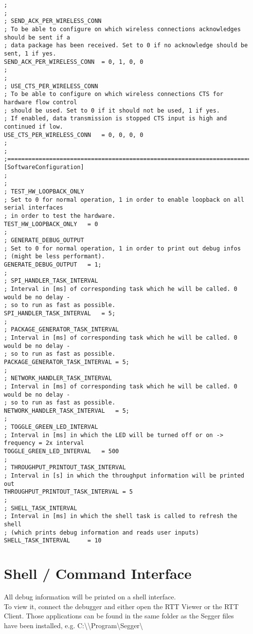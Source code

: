 \begin{lstlisting}
;
;
; SEND_ACK_PER_WIRELESS_CONN
; To be able to configure on which wireless connections acknowledges should be sent if a 
; data package has been received. Set to 0 if no acknowledge should be sent, 1 if yes.
SEND_ACK_PER_WIRELESS_CONN	= 0, 1, 0, 0
;
;
; USE_CTS_PER_WIRELESS_CONN
; To be able to configure on which wireless connections CTS for hardware flow control 
; should be used. Set to 0 if it should not be used, 1 if yes.
; If enabled, data transmission is stopped CTS input is high and continued if low.
USE_CTS_PER_WIRELESS_CONN	= 0, 0, 0, 0
;
;
;========================================================================================
[SoftwareConfiguration]
;
;
; TEST_HW_LOOPBACK_ONLY
; Set to 0 for normal operation, 1 in order to enable loopback on all serial interfaces 
; in order to test the hardware.
TEST_HW_LOOPBACK_ONLY	= 0
;
; GENERATE_DEBUG_OUTPUT
; Set to 0 for normal operation, 1 in order to print out debug infos 
; (might be less performant).
GENERATE_DEBUG_OUTPUT	= 1;
;
; SPI_HANDLER_TASK_INTERVAL
; Interval in [ms] of corresponding task which he will be called. 0 would be no delay - 
; so to run as fast as possible.
SPI_HANDLER_TASK_INTERVAL	= 5;
;
; PACKAGE_GENERATOR_TASK_INTERVAL
; Interval in [ms] of corresponding task which he will be called. 0 would be no delay - 
; so to run as fast as possible.
PACKAGE_GENERATOR_TASK_INTERVAL	= 5;
;
; NETWORK_HANDLER_TASK_INTERVAL
; Interval in [ms] of corresponding task which he will be called. 0 would be no delay - 
; so to run as fast as possible.
NETWORK_HANDLER_TASK_INTERVAL	= 5;
;
; TOGGLE_GREEN_LED_INTERVAL
; Interval in [ms] in which the LED will be turned off or on -> frequency = 2x interval
TOGGLE_GREEN_LED_INTERVAL	= 500
;
; THROUGHPUT_PRINTOUT_TASK_INTERVAL
; Interval in [s] in which the throughput information will be printed out
THROUGHPUT_PRINTOUT_TASK_INTERVAL = 5
;
; SHELL_TASK_INTERVAL
; Interval in [ms] in which the shell task is called to refresh the shell 
; (which prints debug information and reads user inputs)
SHELL_TASK_INTERVAL		= 10
\end{lstlisting}
%
%
%
%
%
\section{Shell / Command Interface}
All debug information will be printed on a shell interface.\\
To view it, connect the debugger and either open the RTT Viewer or the RTT Client. Those applications can be found in the same folder as the Segger files have been installed, e.g. C:\textbackslash \textbackslash Program\textbackslash Segger\textbackslash